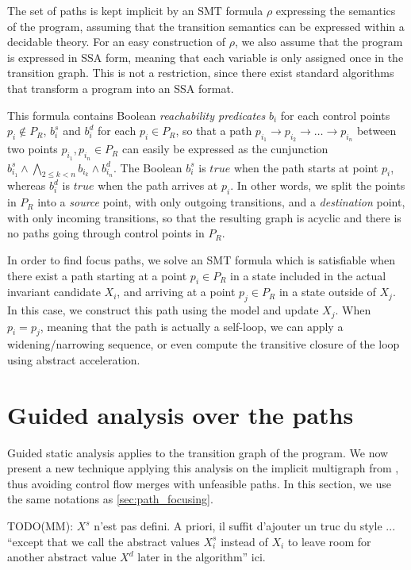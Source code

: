 \documentclass[preprint]{sigplanconf}
\newcommand{\MM}[1]{{\color{blue} TODO(MM): #1}}
\begin{document}
The set of paths is kept implicit by an SMT formula $\rho$ expressing
the semantics of the program, assuming that the transition semantics can be
expressed within a decidable theory. For an easy construction of $\rho$, 
we also assume that the program is expressed in SSA form, meaning that each
variable is only assigned once in the transition graph. This is not a
restriction, since there exist standard algorithms that transform a program into
an SSA format.

This formula contains Boolean \emph{reachability predicates} $b_i$ for each
control points $p_i \notin P_R$, $b_i^s$ and $b_i^d$ for each $p_i \in P_R$, so
that a path 
$p_{i_1} \rightarrow p_{i_2} \rightarrow \dots \rightarrow p_{i_n}$ 
between two points $p_{i_1}, p_{i_n} \in P_R$ 
can easily be expressed as the
cunjunction $b_{i_1}^s \wedge \bigwedge_{2 \leq k < n} b_{i_k} \wedge b_{i_n}^d$.
The Boolean $b_{i}^s$ is $true$ when the path starts at point $p_i$, whereas
$b_i^d$ is $true$ when the path arrives at $p_i$. In other words, we split the
points in $P_R$ into a \emph{source} point, with only outgoing transitions, and
a \emph{destination} point, with only incoming transitions, so that the
resulting graph is acyclic and there is no paths going through control
points in $P_R$.

In order to find focus paths, we solve an SMT formula which is satisfiable when
there exist a path starting at a point $p_i \in P_R$ in a state included in the
actual invariant candidate $X_i$, and arriving at a point $p_j \in P_R$ in a
state outside of $X_j$. In this case, we construct this path using the model and
update $X_j$. When $p_i = p_j$, meaning that the path is actually a self-loop,
we can apply a widening/narrowing sequence, or even compute the transitive
closure of the loop using abstract acceleration. %

\section{Guided analysis over the paths}
\label{sec:guided_multigraph}

Guided static analysis \cite{DBLP:conf/sas/GopanR07} applies to the transition
graph of the program. We now present a new technique applying this analysis on the implicit
multigraph from \cite{Monniaux_Gonnord_SAS11}, thus avoiding control flow merges with
unfeasible paths.
In this section, we use the same notations as \ref{sec:path_focusing}.

\MM{$X^s$ n'est pas defini. A priori, il suffit d'ajouter un truc du style ... ``except that we call the abstract values $X_i^s$ instead of $X_i$ to leave room for another abstract value $X^d$ later in the algorithm'' ici.}
\end{document}
